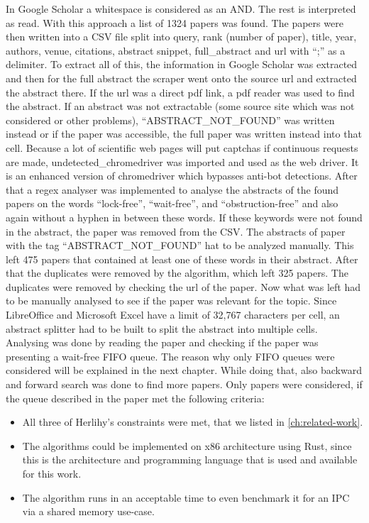 In Google Scholar a whitespace is considered as an AND. The rest is interpreted as read. With this approach a list of 1324 papers was found. The papers were then written into a CSV file split into query, rank (number of paper), title, year, authors, venue, citations, abstract snippet, full\_abstract and url with \enquote{;} as a delimiter. To extract all of this, the information in Google Scholar was extracted and then for the full abstract the scraper went onto the source url and extracted the abstract there. If the url was a direct pdf link, a pdf reader was used to find the abstract. If an abstract was not extractable (some source site which was not considered or other problems), \enquote{ABSTRACT\_NOT\_FOUND} was written instead or if the paper was accessible, the full paper was written instead into that cell. Because a lot of scientific web pages will put captchas if continuous requests are made, undetected\_chromedriver was imported and used as the web driver. It is an enhanced version of chromedriver which bypasses anti-bot detections. After that a regex analyser was implemented to analyse the abstracts of the found papers on the words \enquote{lock-free}, \enquote{wait-free}, and \enquote{obstruction-free} and also again without a hyphen in between these words. If these keywords were not found in the abstract, the paper was removed from the CSV. The abstracts of paper with the tag \enquote{ABSTRACT\_NOT\_FOUND} hat to be analyzed manually. This left 475 papers that contained at least one of these words in their abstract. After that the duplicates were removed by the algorithm, which left 325 papers. The duplicates were removed by checking the url of the paper. Now what was left had to be manually analysed to see if the paper was relevant for the topic. Since LibreOffice and Microsoft Excel have a limit of 32,767 characters per cell, an abstract splitter had to be built to split the abstract into multiple cells. Analysing was done by reading the paper and checking if the paper was presenting a wait-free \ac{FIFO} queue. The reason why only \ac{FIFO} queues were considered will be explained in the next chapter. While doing that, also backward and forward search was done to find more papers. Only papers were considered, if the queue described in the paper met the following criteria: 
\begin{itemize}
   \item All three of Herlihy's constraints were met, that we listed in \cref{ch:related-work}.
   \item The algorithms could be implemented on x86 architecture using Rust, since this is the architecture and programming language that is used and available for this work.
   \item The algorithm runs in an acceptable time to even benchmark it for an \ac{IPC} via a shared memory use-case.
\end{itemize}
